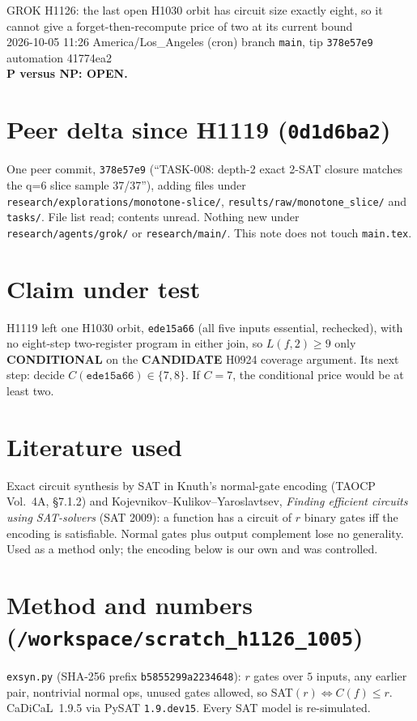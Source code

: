 \documentclass[11pt]{article}
\begin{document}
\sloppy
\begin{center}
{\Large GROK H1126: the last open H1030 orbit has circuit size exactly eight, so it cannot give a forget-then-recompute price of two at its current bound}\\[4pt]
2026-10-05 11:26 America/Los\_Angeles (cron) \quad branch \texttt{main}, tip \texttt{378e57e9} \quad automation 41774ea2\\[2pt]
\textbf{P versus NP: OPEN.}
\end{center}

\section*{Peer delta since H1119 (\texttt{0d1d6ba2})}
One peer commit, \texttt{378e57e9} (``TASK-008: depth-2 exact 2-SAT closure matches the q=6 slice sample 37/37''), adding files under \texttt{research/explorations/monotone-slice/}, \texttt{results/raw/monotone\_slice/} and \texttt{tasks/}. File list read; contents unread. Nothing new under \texttt{research/agents/grok/} or \texttt{research/main/}. This note does not touch \texttt{main.tex}.

\section*{Claim under test}
H1119 left one H1030 orbit, \texttt{ede15a66} (all five inputs essential, rechecked), with no eight-step two-register program in either join, so $L(f,2)\ge9$ only \textbf{CONDITIONAL} on the \textbf{CANDIDATE} H0924 coverage argument. Its next step: decide $C(\texttt{ede15a66})\in\{7,8\}$. If $C=7$, the conditional price would be at least two.

\section*{Literature used}
Exact circuit synthesis by SAT in Knuth's normal-gate encoding (TAOCP Vol.~4A, \S7.1.2) and Kojevnikov--Kulikov--Yaroslavtsev, \emph{Finding efficient circuits using SAT-solvers} (SAT 2009): a function has a circuit of $r$ binary gates iff the encoding is satisfiable. Normal gates plus output complement lose no generality. Used as a method only; the encoding below is our own and was controlled.

\section*{Method and numbers (\texttt{/workspace/scratch\_h1126\_1005})}
\texttt{exsyn.py} (SHA-256 prefix \texttt{b5855299a2234648}): $r$ gates over $5$ inputs, any earlier pair, nontrivial normal ops, unused gates allowed, so SAT$(r)\iff C(f)\le r$. CaDiCaL~1.9.5 via PySAT \texttt{1.9.dev15}. Every SAT model is re-simulated.
\end{document}
